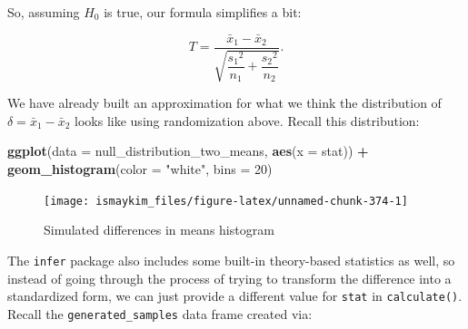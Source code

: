 \documentclass[12pt, krantz2,]{krantz}
\makeatletter
\newenvironment{Shaded}{\begin{snugshade}}{\end{snugshade}}
\newcommand{\DataTypeTok}[1]{\textcolor[rgb]{0.27,0.27,0.27}{#1}}
\newcommand{\DecValTok}[1]{\textcolor[rgb]{0.06,0.06,0.06}{#1}}
\newcommand{\KeywordTok}[1]{\textcolor[rgb]{0.27,0.27,0.27}{\textbf{#1}}}
\newcommand{\NormalTok}[1]{#1}
\newcommand{\OperatorTok}[1]{\textcolor[rgb]{0.43,0.43,0.43}{\textbf{#1}}}
\newcommand{\StringTok}[1]{\textcolor[rgb]{0.5,0.5,0.5}{#1}}
\newenvironment{kframe}{%
\medskip{}
\setlength{\fboxsep}{.8em}
 \def\at@end@of@kframe{}%
 \ifinner\ifhmode%
  \def\at@end@of@kframe{\end{minipage}}%
  \begin{minipage}{\columnwidth}%
 \fi\fi%
 \def\FrameCommand##1{\hskip\@totalleftmargin \hskip-\fboxsep
 \colorbox{shadecolor}{##1}\hskip-\fboxsep
     \hskip-\linewidth \hskip-\@totalleftmargin \hskip\columnwidth}%
 \MakeFramed {\advance\hsize-\width
   \@totalleftmargin\z@ \linewidth\hsize
   \@setminipage}}%
 {\par\unskip\endMakeFramed%
 \at@end@of@kframe}
\renewenvironment{Shaded}{\begin{kframe}}{\end{kframe}}
\makeatother
\begin{document}
So, assuming \(H_0\) is true, our formula simplifies a bit:

\[T =\dfrac{ \bar{x}_1 - \bar{x}_2}{ \sqrt{\dfrac{{s_1}^2}{n_1} + \dfrac{{s_2}^2}{n_2}}  }.\]

We have already built an approximation for what we think the distribution of \(\delta = \bar{x}_1 - \bar{x}_2\) looks like using randomization above. Recall this distribution:

\begin{Shaded}
\begin{Highlighting}[]
\KeywordTok{ggplot}\NormalTok{(}\DataTypeTok{data =}\NormalTok{ null_distribution_two_means, }\KeywordTok{aes}\NormalTok{(}\DataTypeTok{x =}\NormalTok{ stat)) }\OperatorTok{+}
\StringTok{  }\KeywordTok{geom_histogram}\NormalTok{(}\DataTypeTok{color =} \StringTok{"white"}\NormalTok{, }\DataTypeTok{bins =} \DecValTok{20}\NormalTok{)}
\end{Highlighting}
\end{Shaded}

\begin{figure}

{\centering \texttt{[image: ismaykim\_files/figure-latex/unnamed-chunk-374-1]} 

}

\caption{Simulated differences in means histogram}\label{fig:unnamed-chunk-374}
\end{figure}

The \texttt{infer} package also includes some built-in theory-based statistics as well, so instead of going through the process of trying to transform the difference into a standardized form, we can just provide a different value for \texttt{stat} in \texttt{calculate()}. Recall the \texttt{generated\_samples} data frame created via:

\begin{Shaded}
\end{Shaded}
\end{document}
